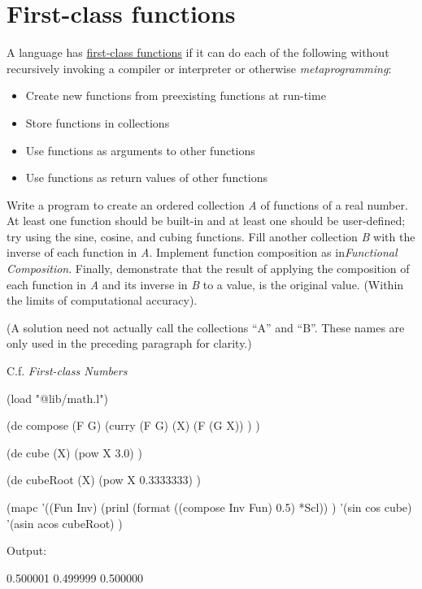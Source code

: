 \pagebreak{}
\section*{First-class functions}

A language has
\href{http://en.wikipedia.org/wiki/First-class\_function}{first-class
  functions} if it can do each of the following without recursively
invoking a compiler or interpreter or otherwise
\emph{metaprogramming}:

\begin{itemize}
\item
  Create new functions from preexisting functions at run-time
\item
  Store functions in collections
\item
  Use functions as arguments to other functions
\item
  Use functions as return values of other functions
\end{itemize}

Write a program to create an ordered collection \emph{A} of functions
of a real number. At least one function should be built-in and at
least one should be user-defined; try using the sine, cosine, and
cubing functions. Fill another collection \emph{B} with the inverse of
each function in \emph{A}. Implement function composition as
in\emph{Functional Composition}. Finally, demonstrate that the result
of applying the composition of each function in \emph{A} and its
inverse in \emph{B} to a value, is the original value. (Within the
limits of computational accuracy).

(A solution need not actually call the collections ``A'' and ``B''.
These names are only used in the preceding paragraph for clarity.)

C.f. \emph{First-class Numbers}


\begin{wideverbatim}

(load "@lib/math.l")

(de compose (F G)
   (curry (F G) (X)
      (F (G X)) ) )

(de cube (X)
   (pow X 3.0) )

(de cubeRoot (X)
   (pow X 0.3333333) )

(mapc
   '((Fun Inv)
      (prinl (format ((compose Inv Fun) 0.5) *Scl)) )
   '(sin  cos  cube)
   '(asin acos cubeRoot) )

Output:

0.500001
0.499999
0.500000

\end{wideverbatim}

